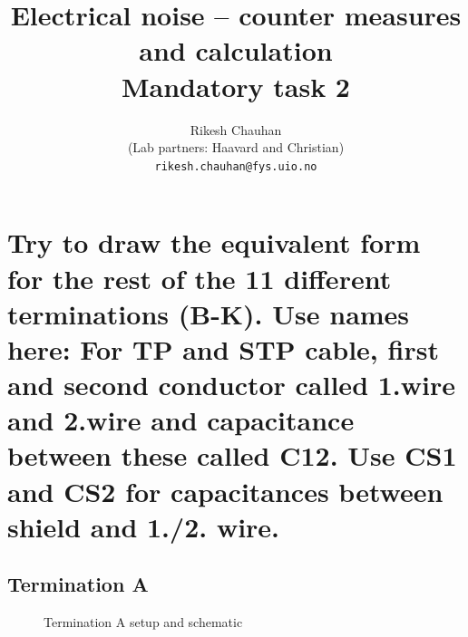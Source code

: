 \documentclass[12pt,a4paper,UKenglish]{article}
\title{Electrical noise – counter measures and calculation\\
Mandatory task 2}
\author{Rikesh Chauhan\\ 
(Lab partners: Haavard and Christian) \\ 
\texttt{rikesh.chauhan@fys.uio.no}}
\date{}
\begin{document}
\maketitle

\section{Try to draw the equivalent form for the rest of the 11 different terminations (B-K). Use names here: For TP and STP cable, first and second conductor called 1.wire and 2.wire and capacitance between these called C12. Use CS1 and CS2 for capacitances between shield and 1./2. wire.}
\subsection{Termination A}
\begin{figure} [H]
  \centering 
\hfill
 \caption{Termination A setup and schematic} 
\label{fig:term_a} 
\end{figure}
\end{document}
